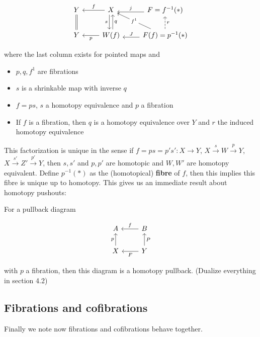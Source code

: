 \[\begin{tikzcd}
	Y & X & {F=f^{-1}(*)} \\
	Y & {W(f)} & {F(f)=p^{-1}(*)}
	\arrow[Rightarrow, no head, from=1-1, to=2-1]
	\arrow["f"', from=1-2, to=1-1]
	\arrow["p", from=2-2, to=2-1]
	\arrow["s"', shift right=1, from=1-2, to=2-2]
	\arrow["q"', shift right=1, from=2-2, to=1-2]
	\arrow["j"', shift left=1, from=1-3, to=1-2]
	\arrow["J"', shift left=1, from=2-3, to=2-2]
    \arrow["{f^1}"{description}, from=2-3, to=1-2]
	\arrow["r"', dashed, from=2-3, to=1-3]
\end{tikzcd}\]

where the last column exists for pointed maps and

\begin{itemize}
    \item $p,q,f^1$ are fibrations
    \item $s$ is a shrinkable map with inverse $q$
    \item $f=ps$, $s$ a homotopy equivalence and $p$ a fibration
    \item If $f$ is a fibration, then $q$ is a homotopy equivalence over $Y$ and $r$ the induced homotopy equivalence
\end{itemize}

This factorization is unique in the sense if $f=ps=p's':X\to Y$, $X\overset s\to W\overset p\to Y$, $X\overset{s'}\to Z'\overset{p'}\to Y$, then $s,s'$ and $p,p'$ are homotopic and $W,W'$ are homotopy equivalent. Define $p^{-1}(*)$ as the (homotopical) \textbf{fibre} of $f$, then this implies this fibre is unique up to homotopy. This gives us an immediate result about homotopy pushouts:

For a pullback diagram

\[\begin{tikzcd}
	A & B \\
	X & Y
    \arrow["f"', from=1-2, to=1-1]
    \arrow["p", from=2-1, to=1-1]
    \arrow["F", from=2-2, to=2-1]
    \arrow["P"', from=2-2, to=1-2]
\end{tikzcd}\]

with $p$ a fibration, then this diagram is a homotopy pullback. (Dualize everything in section 4.2)

\subsection{Fibrations and cofibrations}

Finally we note now fibrations and cofibrations behave together.

